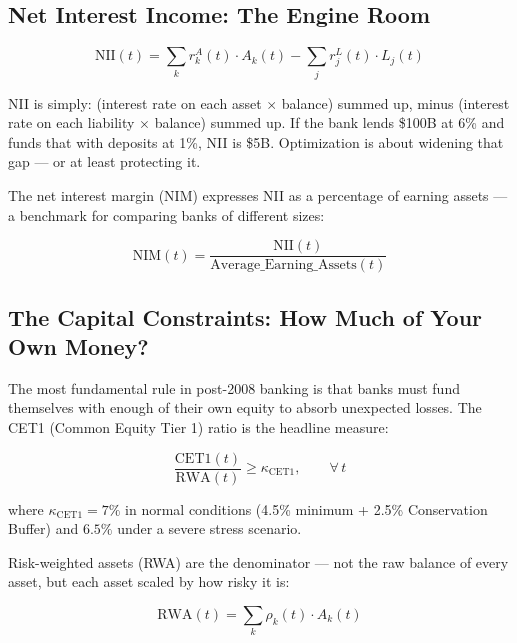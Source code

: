 \documentclass[12pt,a4paper]{article}
\begin{document}
\subsection{Net Interest Income: The Engine Room}

\begin{equation}
  \text{NII}(t) = \sum_k r_k^A(t) \cdot A_k(t) - \sum_j r_j^L(t) \cdot L_j(t)
\end{equation}

\begin{mdframed}[style=plainenglish]
NII is simply: (interest rate on each asset $\times$ balance) summed up,
minus (interest rate on each liability $\times$ balance) summed up.
If the bank lends \$100B at 6\% and funds that with deposits at 1\%,
NII is \$5B.  Optimization is about widening that gap --- or at least
protecting it.
\end{mdframed}

The net interest margin (NIM) expresses NII as a percentage of earning
assets --- a benchmark for comparing banks of different sizes:

\begin{equation}
  \text{NIM}(t) = \frac{\text{NII}(t)}{\text{Average\_Earning\_Assets}(t)}
\end{equation}

\subsection{The Capital Constraints: How Much of Your Own Money?}

The most fundamental rule in post-2008 banking is that banks must fund
themselves with enough of their own equity to absorb unexpected losses.
The CET1 (Common Equity Tier 1) ratio is the headline measure:

\begin{equation}
  \frac{\text{CET1}(t)}{\text{RWA}(t)} \geq \kappa_{\text{CET1}}, \qquad \forall\, t
  \label{eq:cet1}
\end{equation}

where $\kappa_{\text{CET1}} = 7\%$ in normal conditions
(4.5\% minimum + 2.5\% Conservation Buffer) and $6.5\%$ under a severe
stress scenario.

Risk-weighted assets (RWA) are the denominator --- not the raw balance of
every asset, but each asset scaled by how risky it is:

\begin{equation}
  \text{RWA}(t) = \sum_k \rho_k(t) \cdot A_k(t)
  \label{eq:rwa}
\end{equation}
\end{document}
